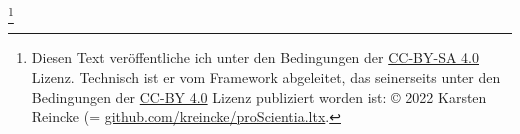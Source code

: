 
\footnote{Diesen Text veröffentliche ich unter den Bedingungen der \href{https://creativecommons.org/licenses/by-sa/4.0}{CC-BY-SA 4.0} Lizenz. Technisch ist er vom Framework  abgeleitet, das seinerseits unter den Bedingungen der \href{https://creativecommons.org/licenses/by/4.0}{CC-BY 4.0} Lizenz publiziert worden ist: \copyright{} 2022 Karsten Reincke (= \href{https://github.com/kreincke/proScientia.ltx}{github.com/kreincke/proScientia.ltx}.}
